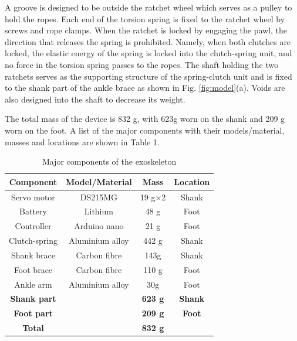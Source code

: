 \documentclass[twocolumn,cleanfoot,10pt]{asme2ej}
\begin{document}
A groove is designed to be outside the ratchet wheel which serves as a pulley to hold the ropes.
Each end of the torsion spring is fixed to the ratchet wheel by screws and rope clamps.
When the ratchet is locked by engaging the pawl, the direction that releases the spring is prohibited. 
Namely, when both clutches are locked, the elastic energy of the spring is locked into the clutch-spring unit, and no force in the torsion spring passes to the ropes.
The shaft holding the two ratchets serves as the supporting structure of the spring-clutch unit and is fixed to the shank part of the ankle brace as shown in Fig. \ref{fig:model}(a).
Voids are also designed into the shaft to decrease its weight.

The total mass of the device is 832 g, with 623g worn on the shank and 209 g worn on the foot.
A list of the major components with their models/material, masses and locations are shown in
Table 1.


\begin{table}[t]
	\caption{Major components of the exoskeleton}
	\begin{center}
		\label{tab:hardware}
		\begin{tabular}{c c c c}	
			\hline
			\textbf{Component} & \textbf{Model/Material} & \textbf{Mass} & \textbf{Location} \\
			\hline
			Servo motor & DS215MG & 19 g$\times$2 & Shank\\
			Battery & Lithium & 48 g & Foot\\
			Controller & Arduino nano & 21 g & Foot\\
			Clutch-spring & Aluminium alloy & 442 g & Shank\\
			Shank brace & Carbon fibre & 143g & Shank\\
			Foot brace & Carbon fibre & 110 g & Foot\\
			Ankle arm & Aluminium alloy & 30g & Foot\\			
			\hline 
			\textbf{Shank part} & & \textbf{623 g} & \textbf{Shank}\\
			\textbf{Foot part} & & \textbf{209 g} & \textbf{Foot}\\
			\hline
			\textbf{Total} & & \textbf{832 g} & \\
			\hline
		\end{tabular}
	\end{center}
\end{table}
\end{document}

